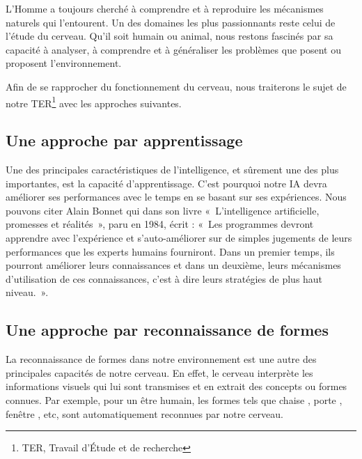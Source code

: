L’Homme a toujours cherché à comprendre et à reproduire les mécanismes naturels qui l'entourent. Un des domaines les plus passionnants reste celui de l'étude du cerveau. Qu'il soit humain ou animal, nous restons fascinés par sa capacité à analyser, à comprendre et à généraliser les problèmes que posent ou \og proposent \fg{} l'environnement.

Afin de se rapprocher du fonctionnement du cerveau, nous traiterons le sujet de notre TER\footnote{TER, Travail d'Étude et de recherche} avec les approches suivantes.


\subsection{Une approche par apprentissage}

Une des principales caractéristiques de l'intelligence, et sûrement une des plus importantes, est la capacité d'apprentissage. C'est pourquoi notre IA devra améliorer ses performances avec le temps en se basant sur ses expériences. Nous pouvons citer Alain Bonnet qui dans son livre «~L'intelligence artificielle, promesses et réalités~», paru en 1984, écrit : «~Les programmes devront apprendre  avec l'expérience et s'auto-améliorer sur de simples jugements de leurs performances que les experts humains fourniront. Dans un premier temps, ils pourront améliorer leurs connaissances et dans un deuxième, leurs mécanismes d'utilisation de ces connaissances, c'est à dire leurs stratégies de plus haut niveau.~».


\subsection{Une approche par reconnaissance de formes}

La reconnaissance de formes dans notre environnement est une autre des principales capacités de notre cerveau. En effet, le cerveau interprète les informations visuels qui lui sont transmises et en extrait des concepts ou formes connues. Par exemple, pour un être humain, les formes tels que \og chaise \fg{}, \og porte \fg{}, \og fenêtre \fg{}, etc, sont automatiquement reconnues par notre cerveau.

